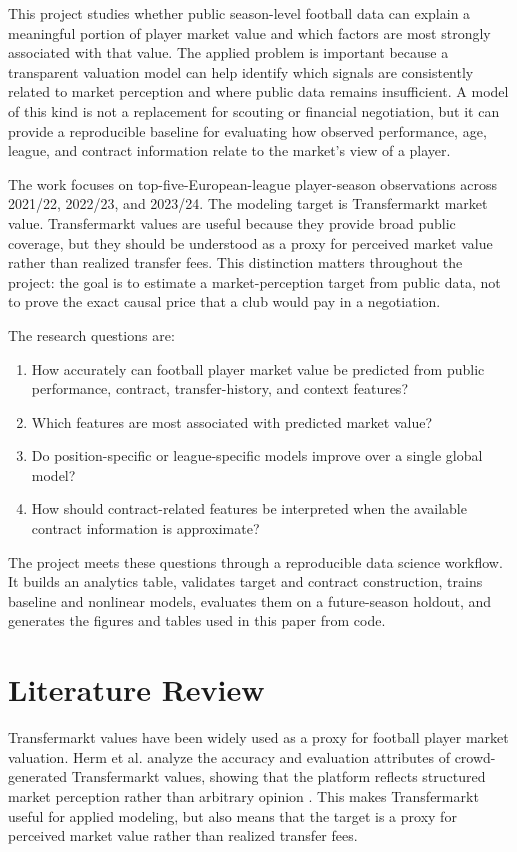 \documentclass[conference]{IEEEtran}
\begin{document}
This project studies whether public season-level football data can explain a meaningful portion of player market value and which factors are most strongly associated with that value. The applied problem is important because a transparent valuation model can help identify which signals are consistently related to market perception and where public data remains insufficient. A model of this kind is not a replacement for scouting or financial negotiation, but it can provide a reproducible baseline for evaluating how observed performance, age, league, and contract information relate to the market's view of a player.

The work focuses on top-five-European-league player-season observations across 2021/22, 2022/23, and 2023/24. The modeling target is Transfermarkt market value. Transfermarkt values are useful because they provide broad public coverage, but they should be understood as a proxy for perceived market value rather than realized transfer fees. This distinction matters throughout the project: the goal is to estimate a market-perception target from public data, not to prove the exact causal price that a club would pay in a negotiation.

The research questions are:
\begin{enumerate}
    \item How accurately can football player market value be predicted from public performance, contract, transfer-history, and context features?
    \item Which features are most associated with predicted market value?
    \item Do position-specific or league-specific models improve over a single global model?
    \item How should contract-related features be interpreted when the available contract information is approximate?
\end{enumerate}

The project meets these questions through a reproducible data science workflow. It builds an analytics table, validates target and contract construction, trains baseline and nonlinear models, evaluates them on a future-season holdout, and generates the figures and tables used in this paper from code.

\section{Literature Review}
Transfermarkt values have been widely used as a proxy for football player market valuation. Herm et al. analyze the accuracy and evaluation attributes of crowd-generated Transfermarkt values, showing that the platform reflects structured market perception rather than arbitrary opinion \cite{herm2014crowd}. This makes Transfermarkt useful for applied modeling, but also means that the target is a proxy for perceived market value rather than realized transfer fees.
\end{document}
